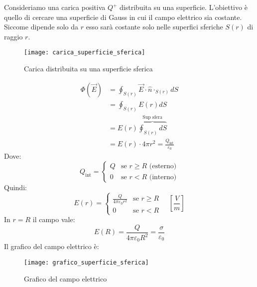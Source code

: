 \documentclass[a4paper]{article}
\begin{document}
\begin{example}
  Consideriamo una carica positiva \( Q^+ \) distribuita su una superficie. L'obiettivo
  è quello di cercare una superficie di Gauss in cui il campo elettrico sia costante.
  Siccome dipende solo da \( r \) esso sarà costante solo nelle superfici sferiche \( S(r) \) 
  di raggio \( r \).
  \begin{figure}[H]
    \centering
    \texttt{[image: carica\_superficie\_sferica]}
    \caption{Carica distribuita su una superficie sferica}
  \end{figure}
  \[
    \begin{aligned}
      \Phi(\vec{E}) &= \oint_{S(r)} \vec{E} \cdot \hat{n} \cdot_{S(r)} dS\\
      &= \oint_{S(r)} E(r) dS\\
      &= E(r) \overbrace{\oint_{S(r)} dS}^{\text{Sup sfera}}\\
      &= E(r) \cdot 4 \pi r^2 = \frac{Q_{\text{int}}}{\varepsilon_0}
    \end{aligned}
  \]
  Dove:
  \[
    Q_{\text{int}} =
  \begin{cases}
    Q & \text{se } r \ge R \text{ (esterno)}\\
    0 & \text{se } r < R \text{ (interno)}
  \end{cases}
  \] 
  Quindi:
  \[
    E(r) = \begin{cases}
      \frac{Q}{4 \pi \varepsilon_0 r^2} & \text{se } r \ge R\\
      0 & \text{se } r < R
    \end{cases}
    \quad \left[ \frac{V}{m} \right]
  \] 
  In \( r = R \) il campo vale:
  \[
    E(R) = \frac{Q}{4 \pi \varepsilon_0 R^2} = \frac{\sigma}{\varepsilon_0}
  \] 
  Il grafico del campo elettrico è:
  \begin{figure}[H]
    \centering
    \texttt{[image: grafico\_superficie\_sferica]}
    \caption{Grafico del campo elettrico}
  \end{figure}
\end{example}
\end{document}
